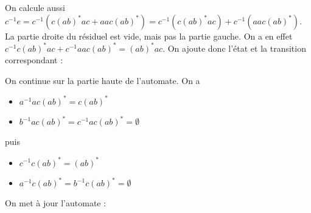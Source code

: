 \begin{example}
On calcule aussi $c^{-1}e = c^{-1}(c(ab)^*ac + aac(ab)^*) = c^{-1}(c(ab)^*ac) + c^{-1}(aac(ab)^*)$. La partie droite du résiduel est vide, mais pas la partie gauche. On a en effet \newline $c^{-1}c(ab)^*ac + c^{-1}aac(ab)^* = (ab)^*ac$. On ajoute donc l'état et la transition correspondant :



\begin{figure}[H]
\centering

\end{figure}

On continue sur la partie haute de l'automate. On a 

\begin{itemize}
\item $a^{-1}ac(ab)^* = c(ab)^*$
\item $b^{-1}ac(ab)^* = c^{-1}ac(ab)^* = \emptyset$
\end{itemize}

puis

\begin{itemize}
\item $c^{-1}c(ab)^* = (ab)^*$
\item $a^{-1}c(ab)^* = b^{-1}c(ab)^* = \emptyset$
\end{itemize}

On met à jour l'automate : 



\end{example}
